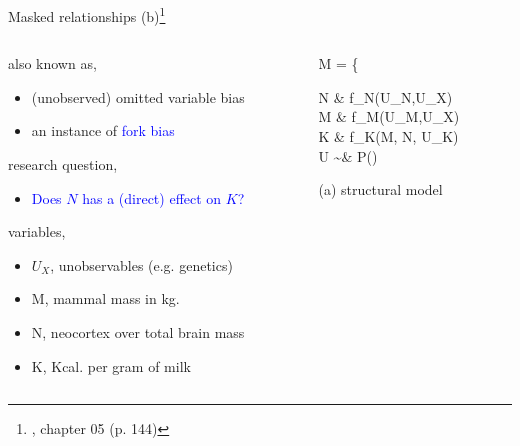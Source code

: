 \begin{frame}
	{Masked relationships (b)\footnote{\citet{McElreath_2020}, chapter 05 (p. 144)}}
	\begin{columns}
		\begin{column}{0.5\textwidth}
			also known as,
			\begin{itemize}
				\item (unobserved) omitted variable bias
				\item an instance of \textcolor{blue}{fork bias}
			\end{itemize}
			
			research question, 
			\begin{itemize}
				\item \textcolor{blue}{Does $N$ has a (direct) effect on $K$?}
			\end{itemize}
			
			variables,
			\begin{itemize}
				\item $U_{X}$, unobservables (e.g. genetics)
				\item M, mammal mass in kg.
				\item N, neocortex over total brain mass
				\item K, Kcal. per gram of milk
			\end{itemize}
		\end{column}
		\begin{column}{0.5\textwidth}  
			\begin{equ}
				M = \left\{ \begin{aligned} 
					N \leftarrow & \; f_{N}(U_{N},U_{X}) \\
					M \leftarrow & \; f_{M}(U_{M},U_{X}) \\
					K \leftarrow & \; f_{K}(M, N, U_{K}) \\
					U \sim & \; P()
				\end{aligned} \right
				\caption*{(a) structural model}
			\end{equ}
			\begin{figure}
\end{figure}
\end{column}
\end{columns}
\end{frame}

